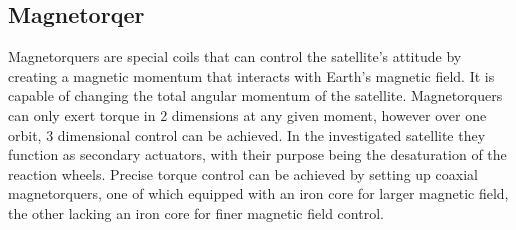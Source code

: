 \subsection{Magnetorqer}

Magnetorquers are special coils that can control the satellite's attitude by creating a magnetic momentum that interacts with Earth's magnetic field. It is capable of changing the total angular momentum of the satellite. Magnetorquers can only exert torque in 2 dimensions at any given moment, however over one orbit, 3 dimensional control can be achieved. In the investigated satellite they function as secondary actuators, with their purpose being the desaturation of the reaction wheels. Precise torque control can be achieved by setting up coaxial magnetorquers, one of which equipped with an iron core for larger magnetic field, the other lacking an iron core for finer magnetic field control.